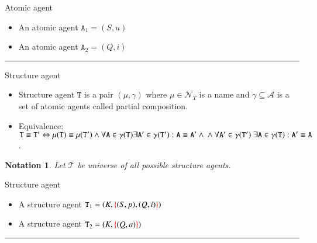 \documentclass{elsarticle}
\newtheorem{notation}{Notation}
\begin{document}
\begin{example}{Atomic agent}

\begin{itemize}
\item An atomic agent $\mathtt{A}_1 = (S, u)$
\item An atomic agent $\mathtt{A}_2 = (Q, i)$
\end{itemize}
\end{example}

\noindent\rule{\textwidth}{1pt}

\begin{definition}{Structure agent}

\begin{itemize}
\item Structure agent $\mathtt{T}$ is a pair $(\mu, \gamma)$ where $\mu \in \mathcal{N}_{T}$ is a name and $\gamma \subseteq \mathcal{A}$ is a set of atomic agents called partial composition.

\item Equivalence: $\mathtt{T} \equiv \mathtt{T}' \Leftrightarrow \mu(\mathtt{T}) \equiv \mu(\mathtt{T}') \wedge \forall \mathtt{A} \in \gamma(\mathtt{T}) \exists \mathtt{A}' \in \gamma(\mathtt{T}') : \mathtt{A} \equiv \mathtt{A}' \wedge \\ \wedge \forall \mathtt{A}' \in \gamma(\mathtt{T}') ~\exists \mathtt{A} \in \gamma(\mathtt{T}) : \mathtt{A}' \equiv \mathtt{A}$.
\end{itemize}
\end{definition}

\begin{notation}
Let $\mathcal{T}$ be universe of all possible structure agents.
\end{notation}

\begin{example}{Structure agent}

\begin{itemize}
\item A structure agent $\mathtt{T}_1 = (K, \textcolor{red}{\{}(S, p), (Q, i)\textcolor{red}{\}})$
\item A structure agent $\mathtt{T}_2 = (K, \textcolor{red}{\{}(Q, a)\textcolor{red}{\}})$
\end{itemize}
\end{example}

\noindent\rule{\textwidth}{1pt}
\end{document}
